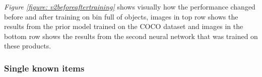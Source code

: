\textit{Figure \ref{figure: v2beforeaftertraining}} shows visually how the performance changed before and after training on bin full of objects, images in top row shows the results from the prior model trained on the COCO dataset  and images in the bottom row shows the results from the second neural network that was trained on these products.

\clearpage
\subsubsection{Single known items} \label{sec:v2resontrained}
\begin{figure}[h]
    \centering
    \hfill
    \hfill

\end{figure}
